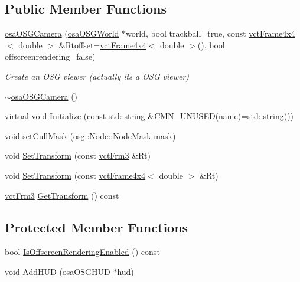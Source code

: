 \subsection*{Public Member Functions}
\begin{DoxyCompactItemize}
\item 
\hyperlink{classosa_o_s_g_camera_a2c2bff6cb9c4e65b4291cb54ad7f85a1}{osa\+O\+S\+G\+Camera} (\hyperlink{classosa_o_s_g_world}{osa\+O\+S\+G\+World} $\ast$world, bool trackball=true, const \hyperlink{classvct_frame4x4}{vct\+Frame4x4}$<$ double $>$ \&Rtoffset=\hyperlink{classvct_frame4x4}{vct\+Frame4x4}$<$ double $>$(), bool offscreenrendering=false)
\begin{DoxyCompactList}\small\item\em Create an O\+S\+G viewer (actually it\textquotesingle{}s a O\+S\+G viewer) \end{DoxyCompactList}\item 
\hyperlink{classosa_o_s_g_camera_a3e1e1489f4542ffd6f74e8c049668e10}{$\sim$osa\+O\+S\+G\+Camera} ()
\item 
virtual void \hyperlink{classosa_o_s_g_camera_a463a7fe829eef9a648d39b7cb8528bbd}{Initialize} (const std\+::string \&\hyperlink{cmn_portability_8h_a021894e2626935fa2305434b1e893ff6}{C\+M\+N\+\_\+\+U\+N\+U\+S\+E\+D}(name)=std\+::string())
\item 
void \hyperlink{classosa_o_s_g_camera_aef6949d5723708087d55450737507e0b}{set\+Cull\+Mask} (osg\+::\+Node\+::\+Node\+Mask mask)
\item 
void \hyperlink{classosa_o_s_g_camera_afd8497bb3272317953841dd6a4b36705}{Set\+Transform} (const \hyperlink{vct_transformation_types_8h_a81feda0a02c2d1bc26e5553f409fed20}{vct\+Frm3} \&Rt)
\item 
void \hyperlink{classosa_o_s_g_camera_ad0c30c16eab718188ad723b8863b6936}{Set\+Transform} (const \hyperlink{classvct_frame4x4}{vct\+Frame4x4}$<$ double $>$ \&Rt)
\item 
\hyperlink{vct_transformation_types_8h_a81feda0a02c2d1bc26e5553f409fed20}{vct\+Frm3} \hyperlink{classosa_o_s_g_camera_a63936900bd08ace45f6147563c9ee358}{Get\+Transform} () const 
\end{DoxyCompactItemize}
\subsection*{Protected Member Functions}
\begin{DoxyCompactItemize}
\item 
bool \hyperlink{classosa_o_s_g_camera_a99b8301f0cc63f54d4d66a74918cace2}{Is\+Offscreen\+Rendering\+Enabled} () const 
\item 
void \hyperlink{classosa_o_s_g_camera_ab83b41f25ac6a65018b5adbfa6bd6f0b}{Add\+H\+U\+D} (\hyperlink{classosa_o_s_g_h_u_d}{osa\+O\+S\+G\+H\+U\+D} $\ast$hud)
\end{DoxyCompactItemize}

